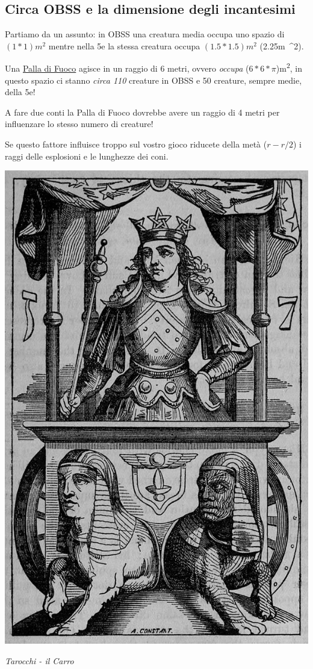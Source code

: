 \begin{multicols}{2}

\subsection*{Circa OBSS e la dimensione degli incantesimi}

Partiamo da un assunto: in OBSS una creatura media occupa uno spazio di $(1*1)\si{m^{2}}$ mentre nella 5e la stessa creatura occupa $(1.5*1.5)\si{m{^2}}$ (2.25\si{m{^2}}).

Una \hyperlink{Palla di Fuoco}{Palla di Fuoco} agisce in un raggio di 6 metri, ovvero \emph{occupa} ($6*6*\pi$)\si{m^{2}}, in questo spazio ci stanno \emph{circa 110} creature in OBSS e 50 creature, sempre medie, della 5e!

A fare due conti la Palla di Fuoco dovrebbe avere un raggio di 4 metri per influenzare lo stesso numero di creature!

Se questo fattore influisce troppo sul vostro gioco riducete della metà ($r-r/2$) i raggi delle esplosioni e le lunghezze dei coni.

\end{multicols}

\vfill

\begin{center}
	\includegraphics[width=0.40\linewidth]{immagini/The_Chariot_of_Hermes.png}

	\emph{Tarocchi - il Carro}
\end{center}





